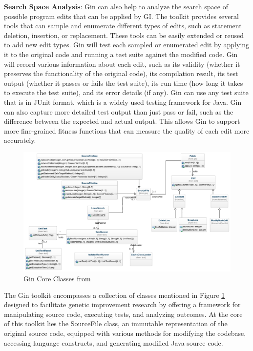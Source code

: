 \vspace{.5em}
\textbf{Search Space Analysis}: Gin can also help to analyze the search space of possible program edits that can be applied by GI. The toolkit provides several tools that can sample and enumerate different types of edits, such as statement deletion, insertion, or replacement. These tools can be easily extended or reused to add new edit types. Gin will test each sampled or enumerated edit by applying it to the original code and running a test suite against the modified code. Gin will record various information about each edit, such as its validity (whether it preserves the functionality of the original code), its compilation result, its test output (whether it passes or fails the test suite), its run time (how long it takes to execute the test suite), and its error details (if any). Gin can use any test suite that is in JUnit format, which is a widely used testing framework for Java. Gin can also capture more detailed test output than just pass or fail, such as the difference between the expected and actual output. This allows Gin to support more fine-grained fitness functions that can measure the quality of each edit more accurately.\par


\begin{figure}[h]
  \centering
  \includegraphics[width=.9\textwidth]{img/Ginclass.png}
  \caption{Gin Core Classes from~\cite{DBLP:conf/gecco/BrownleePABWW19}}
  \label{fig:Gin_Core_Classes}
\end{figure}

The Gin toolkit encompasses a collection of classes mentioned in Figure \ref{fig:Gin_Core_Classes} designed to facilitate genetic improvement research by offering a framework for manipulating source code, executing tests, and analyzing outcomes. At the core of this toolkit lies the SourceFile class, an immutable representation of the original source code, equipped with various methods for modifying the codebase, accessing language constructs, and generating modified Java source code.\par

